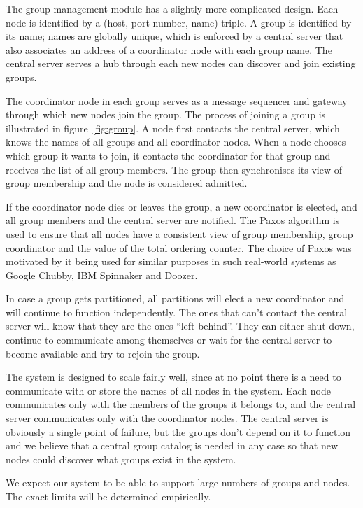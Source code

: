 \documentclass[10pt, oneside]{article}
\begin{document}
The group management module has a slightly more complicated design. Each node is
identified by a (host, port number, name) triple. A group is identified by its
name; names are globally unique, which is enforced by a central server that also
associates an address of a coordinator node with each group name. The central
server serves a hub through each new nodes can discover and join existing
groups.

The coordinator node in each group serves as a message sequencer and gateway
through which new nodes join the group. The process of joining a group is
illustrated in figure~\ref{fig:group}. A node first contacts the central server,
which knows the names of all groups and all coordinator nodes. When a node
chooses which group it wants to join, it contacts the coordinator for that group
and receives the list of all group members. The group then synchronises its view
of group membership and the node is considered admitted.

If the coordinator node dies or leaves the group, a new coordinator is elected,
and all group members and the central server are notified. The Paxos
algorithm\cite{Paxos} is used to ensure that all nodes have a consistent view of
group membership, group coordinator and the value of the total ordering
counter. The choice of Paxos was motivated by it being used for similar purposes
in such real-world systems as Google Chubby\cite{Chubby}, IBM
Spinnaker\cite{Spinnaker} and Doozer\cite{Doozer}.

In case a group gets partitioned, all partitions will elect a new coordinator
and will continue to function independently. The ones that can't contact the
central server will know that they are the ones ``left behind''. They can either
shut down, continue to communicate among themselves or wait for the central
server to become available and try to rejoin the group.

The system is designed to scale fairly well, since at no point there is a need
to communicate with or store the names of all nodes in the system. Each node
communicates only with the members of the groups it belongs to, and the central
server communicates only with the coordinator nodes. The central server is
obviously a single point of failure, but the groups don't depend on it to
function and we believe that a central group catalog is needed in any case so
that new nodes could discover what groups exist in the system.

We expect our system to be able to support large numbers of groups and
nodes. The exact limits will be determined empirically.
\end{document}
